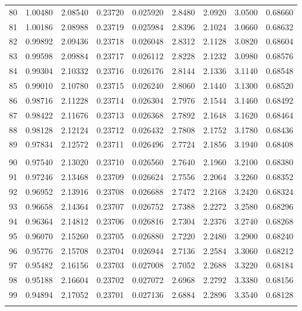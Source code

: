 \documentclass[letter,twosides,10pt]{article}
\begin{document}
\begin{longtable}{|c|c|c|c|c|c|c|c|c|}
 80 & 1.00480 & 2.08540 & 0.23720 & 0.025920 & 2.8480 & 2.0920 & 3.0500 & 0.68660 \\
 81 & 1.00186 & 2.08988 & 0.23719 & 0.025984 & 2.8396 & 2.1024 & 3.0660 & 0.68632 \\
 82 & 0.99892 & 2.09436 & 0.23718 & 0.026048 & 2.8312 & 2.1128 & 3.0820 & 0.68604 \\
 83 & 0.99598 & 2.09884 & 0.23717 & 0.026112 & 2.8228 & 2.1232 & 3.0980 & 0.68576 \\
 84 & 0.99304 & 2.10332 & 0.23716 & 0.026176 & 2.8144 & 2.1336 & 3.1140 & 0.68548 \\
 85 & 0.99010 & 2.10780 & 0.23715 & 0.026240 & 2.8060 & 2.1440 & 3.1300 & 0.68520 \\
 86 & 0.98716 & 2.11228 & 0.23714 & 0.026304 & 2.7976 & 2.1544 & 3.1460 & 0.68492 \\
 87 & 0.98422 & 2.11676 & 0.23713 & 0.026368 & 2.7892 & 2.1648 & 3.1620 & 0.68464 \\
 88 & 0.98128 & 2.12124 & 0.23712 & 0.026432 & 2.7808 & 2.1752 & 3.1780 & 0.68436 \\
 89 & 0.97834 & 2.12572 & 0.23711 & 0.026496 & 2.7724 & 2.1856 & 3.1940 & 0.68408 \\
 & & & & & & & & \\
 90 & 0.97540 & 2.13020 & 0.23710 & 0.026560 & 2.7640 & 2.1960 & 3.2100 & 0.68380 \\
 91 & 0.97246 & 2.13468 & 0.23709 & 0.026624 & 2.7556 & 2.2064 & 3.2260 & 0.68352 \\
 92 & 0.96952 & 2.13916 & 0.23708 & 0.026688 & 2.7472 & 2.2168 & 3.2420 & 0.68324 \\
 93 & 0.96658 & 2.14364 & 0.23707 & 0.026752 & 2.7388 & 2.2272 & 3.2580 & 0.68296 \\
 94 & 0.96364 & 2.14812 & 0.23706 & 0.026816 & 2.7304 & 2.2376 & 3.2740 & 0.68268 \\
 95 & 0.96070 & 2.15260 & 0.23705 & 0.026880 & 2.7220 & 2.2480 & 3.2900 & 0.68240 \\
 96 & 0.95776 & 2.15708 & 0.23704 & 0.026944 & 2.7136 & 2.2584 & 3.3060 & 0.68212 \\
 97 & 0.95482 & 2.16156 & 0.23703 & 0.027008 & 2.7052 & 2.2688 & 3.3220 & 0.68184 \\
 98 & 0.95188 & 2.16604 & 0.23702 & 0.027072 & 2.6968 & 2.2792 & 3.3380 & 0.68156 \\
 99 & 0.94894 & 2.17052 & 0.23701 & 0.027136 & 2.6884 & 2.2896 & 3.3540 & 0.68128 \\
 & & & & & & & & \\

\end{longtable}
\end{document}

